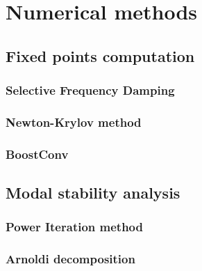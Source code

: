 \section{Numerical methods}
\label{sec: numerics}






  \subsection{Fixed points computation}
  \label{subsec: numerics-fixed points computation}
    \subsubsection{Selective Frequency Damping}

    \subsubsection{Newton-Krylov method}

    \subsubsection{BoostConv}





  \subsection{Modal stability analysis}

    \subsubsection{Power Iteration method}

    \subsubsection{Arnoldi decomposition}


